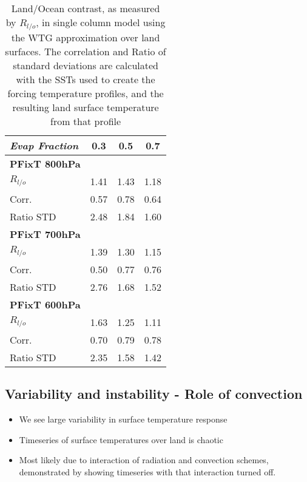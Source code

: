 \begin{center}
	\begin{table}[ht]
		\caption{Land/Ocean contrast, as measured by $R_{l/o}$, in single column 
		model using the WTG approximation over land surfaces. The correlation 
	and Ratio of standard deviations are calculated with the SSTs used to create 
the forcing temperature profiles, and the resulting land surface temperature  
from that profile}

		\label{tab:scmrlo}
		\scriptsize
	\begin{tabular}{ l  c  c  c }
		\textit{Evap Fraction}		& 0.3   & 0.5  & 0.7 \\ \hline
		\textbf{PFixT 800hPa}\\%
		$R_{l/o}$  							& 1.41  & 1.43 & 1.18\\ %
	Corr.							& 0.57  & 0.78 & 0.64\\ %
	Ratio STD           			& 2.48  & 1.84 & 1.60\\ \hline
		\textbf{PFixT 700hPa}\\%
		$R_{l/o}$  							& 1.39  & 1.30 & 1.15\\ %
	Corr.							& 0.50  & 0.77 & 0.76\\ %
	Ratio STD           			& 2.76  & 1.68 & 1.52\\ \hline
		\textbf{PFixT 600hPa}\\%
		$R_{l/o}$  							& 1.63  & 1.25 & 1.11\\ %
	Corr.							& 0.70  & 0.79 & 0.78\\ %
	Ratio STD           			& 2.35  & 1.58 & 1.42\\ \hline
	\end{tabular}
	\end{table}
\end{center}

\subsection{Variability and instability - Role of convection}
\label{instability}

\begin{itemize}
	\item We see large variability in surface temperature response
	\item Timeseries of surface temperatures over land is chaotic
	\item Most likely due to interaction of radiation and convection schemes, 
		demonstrated by showing timeseries with that interaction turned off.
\end{itemize}


